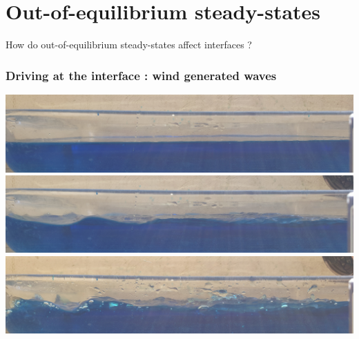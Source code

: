 \documentclass[9pt, dvipsnames,aspectratio=169]{beamer} %
\begin{document}
\section{Out-of-equilibrium steady-states}

\begin{frame}
	\centering
	\huge How do out-of-equilibrium steady-states affect interfaces ?
\end{frame}

\begin{frame}
    \frametitle{Driving at the interface : wind generated waves}
    \centering
    \includegraphics[width=0.55\linewidth]{wave-0.jpg}  \\
    \vspace{0.5cm}
    \includegraphics[width=0.55\linewidth]{wave-1.jpg} \\
    \vspace{0.5cm}    
    \includegraphics[width=0.55\linewidth]{wave-2.jpg} 
\end{frame}
\end{document}
